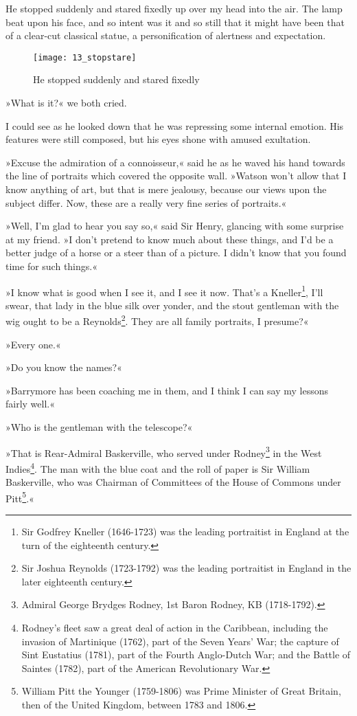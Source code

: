 He stopped suddenly and stared fixedly up over my head into the air. The lamp beat upon his face, and so intent was it and so still that it might have been that of a clear-cut classical statue, a personification of alertness and expectation.

\begin{figure}[tbph]
\centering
\texttt{[image: 13\_stopstare]}
\caption{He stopped suddenly and stared fixedly}
\end{figure}

»What is it?« we both cried.

I could see as he looked down that he was repressing some internal emotion. His features were still composed, but his eyes shone with amused exultation.

»Excuse the admiration of a connoisseur,« said he as he waved his hand towards the line of portraits which covered the opposite wall. »Watson won't allow that I know anything of art, but that is mere jealousy, because our views upon the subject differ. Now, these are a really very fine series of portraits.«

»Well, I'm glad to hear you say so,« said Sir Henry, glancing with some surprise at my friend. »I don't pretend to know much about these things, and I'd be a better judge of a horse or a steer than of a picture. I didn't know that you found time for such things.«

»I know what is good when I see it, and I see it now. That's a Kneller\footnote{Sir Godfrey Kneller (1646-1723) was the leading portraitist in England at the turn of the eighteenth century.}, I'll swear, that lady in the blue silk over yonder, and the stout gentleman with the wig ought to be a Reynolds\footnote{Sir Joshua Reynolds (1723-1792) was the leading portraitist in England in the later eighteenth century.}. They are all family portraits, I presume?«

»Every one.«

»Do you know the names?«

»Barrymore has been coaching me in them, and I think I can say my lessons fairly well.«

»Who is the gentleman with the telescope?«

»That is Rear-Admiral Baskerville, who served under Rodney\footnote{Admiral George Brydges Rodney, 1st Baron Rodney, KB (1718-1792).} in the West Indies\footnote{Rodney's fleet saw a great deal of action in the Caribbean, including the invasion of Martinique (1762), part of the Seven Years' War; the capture of Sint Eustatius (1781), part of the Fourth Anglo-Dutch War; and the Battle of Saintes (1782), part of the American Revolutionary War.}. The man with the blue coat and the roll of paper is Sir William Baskerville, who was Chairman of Committees of the House of Commons under Pitt\footnote{William Pitt the Younger (1759-1806) was Prime Minister of Great Britain, then of the United Kingdom, between 1783 and 1806.}.«

